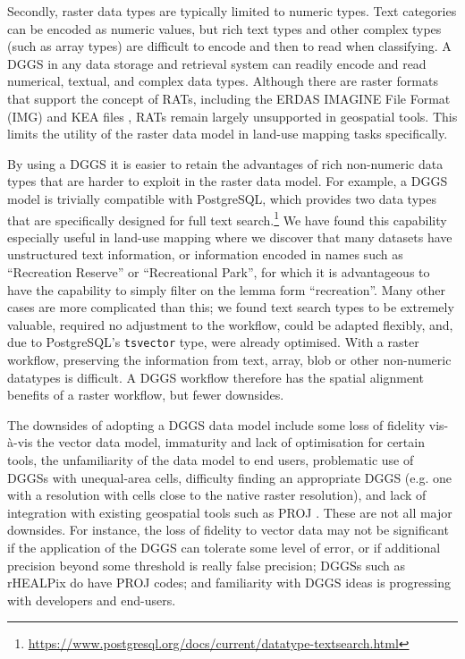 \documentclass[]{interact}
\theoremstyle{plain}%
\theoremstyle{definition}
\theoremstyle{remark}
\begin{document}
Secondly, raster data types are typically limited to numeric types. Text categories can be encoded as numeric values, but rich text types and other complex types (such as array types) are difficult to encode and then to read when classifying. A \ac{DGGS} in any data storage and retrieval system can readily encode and read numerical, textual, and complex data types. Although there are raster formats that support the concept of \acp{RAT}, including the ERDAS IMAGINE File Format (IMG) and KEA files \citep{bunting2013}, \acp{RAT} remain largely unsupported in geospatial tools. This limits the utility of the raster data model in land-use mapping tasks specifically.

By using a \ac{DGGS} it is easier to retain the advantages of rich non-numeric data types that are harder to exploit in the raster data model. For example, a \ac{DGGS} model is trivially compatible with PostgreSQL, which provides two data types that are specifically designed for full text search.\footnote{\url{https://www.postgresql.org/docs/current/datatype-textsearch.html}} We have found this capability especially useful in land-use mapping where we discover that many datasets have unstructured text information, or information encoded in names such as ``Recreation Reserve'' or ``Recreational Park'', for which it is advantageous to have the capability to simply filter on the lemma form ``recreation''. Many other cases are more complicated than this; we found text search types to be extremely valuable, required no adjustment to the workflow, could be adapted flexibly, and, due to PostgreSQL's \texttt{tsvector} type, were already optimised. With a raster workflow, preserving the information from text, array, blob or other non-numeric datatypes is difficult. A \ac{DGGS} workflow therefore has the spatial alignment benefits of a raster workflow, but fewer downsides.

The downsides of adopting a \ac{DGGS} data model include some loss of fidelity vis-\`{a}-vis the vector data model, immaturity and lack of optimisation for certain tools, the unfamiliarity of the data model to end users, problematic use of \acp{DGGS} with unequal-area cells, difficulty finding an appropriate \ac{DGGS} (e.g. one with a resolution with cells close to the native raster resolution), and lack of integration with existing geospatial tools such as PROJ \citep{thompson2022ease}. These are not all major downsides. For instance, the loss of fidelity to vector data may not be significant if the application of the \ac{DGGS} can tolerate some level of error, or if additional precision beyond some threshold is really false precision; \acp{DGGS} such as rHEALPix do have PROJ codes; and familiarity with \ac{DGGS} ideas is progressing with developers and end-users.
\end{document}
